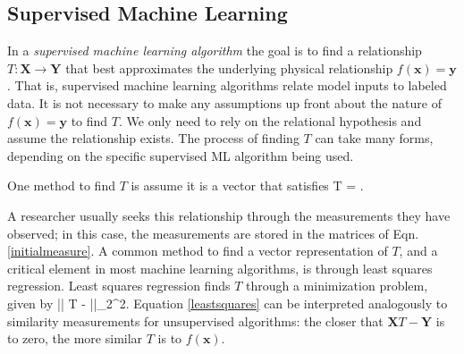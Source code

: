 \subsection{Supervised Machine Learning}
In a \textit{supervised machine learning algorithm} the goal is to find a relationship $T: \mathbf{X} \to \mathbf{Y}$ that best approximates the underlying physical relationship $f(\mathbf{x}) = \mathbf{y}$.
That is, supervised machine learning algorithms relate model inputs to labeled data.
It is not necessary to make any assumptions up front about the nature of $f(\mathbf{x}) = \mathbf{y}$ to find $T$.
We only need to rely on the relational hypothesis and assume the relationship exists.
The process of finding $T$ can take many forms, depending on the specific supervised ML algorithm being used.

One method to find $T$ is assume it is a vector that satisfies
\eqn
{}T = .
\label{map}
\equ

A researcher usually seeks this relationship through the measurements they have observed; in this case, the measurements are stored in the matrices of Eqn. \ref{initialmeasure}.
A common method to find a vector representation of $T$, and a critical element in most machine learning algorithms, is through least squares regression. Least squares regression finds $T$ through a minimization problem, given by
\eqn
\min || T -  ||_{2}^{2}.
\label{leastsquares}
\equ
Equation \ref{leastsquares} can be interpreted analogously to similarity measurements for unsupervised algorithms: the closer that $\mathbf{X}T - \mathbf{Y}$ is to zero, the more similar $T$ is to $f(\mathbf{x})$.



